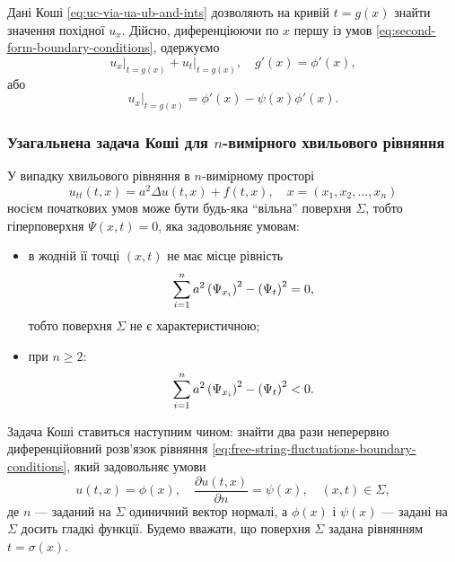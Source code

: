 Дані Коші \eqref{eq:uc-via-ua-ub-and-ints} дозволяють на кривій $t = g(x)$ знайти значення похідної $u_x$. Дійсно, диференціюючи по $x$ першу із умов \eqref{eq:second-form-boundary-conditions}, одержуємо
\begin{equation}
    \left. u_x \right|_{t = g(x)} + \left. u_t \right|_{t = g(x)}, \quad g'(x) = \phi'(x),
\end{equation}
або
\begin{equation}
    \left. u_x \right|_{t = g(x)} = \phi'(x) - \psi(x) \phi'(x).
\end{equation}

\subsubsection{Узагальнена задача Коші для \texorpdfstring{$n$}{n}-вимірного хвильового рівняння}

У випадку хвильового рівняння в $n$-вимірному просторі
\begin{equation}
    \label{eq:utt-equation}
    u_{tt}(t, x) = a^2 \Delta u(t, x) + f(t, x), \quad x = (x_1, x_2, \ldots, x_n)
\end{equation}
носієм початкових умов може бути будь-яка ``вільна'' поверхня $\Sigma$, тобто гіперповерхня $\Psi(x, t) = 0$, яка задовольняє умовам:
\begin{itemize}
    \item в жодній її точці $(x, t)$ не має місце рівність
    \begin{equation}
        \displaystyle\sum\limits_{i = 1}^n a^2 \left( \Psi_{x_i} \right)^2 - \left( \Psi_t \right)^2 = 0,
    \end{equation}
    тобто поверхня $\Sigma$ не є характеристичною;
    \item при $n \ge 2$:
    \begin{equation}
        \label{eq:psi-inequality-condition}
        \displaystyle\sum\limits_{i = 1}^n a^2 \left( \Psi_{x_i} \right)^2 - \left( \Psi_t \right)^2 < 0.
    \end{equation}
\end{itemize}

Задача Коші ставиться наступним чином: знайти два рази неперервно диференційовний розв'язок рівняння \eqref{eq:free-string-fluctuations-boundary-conditions}, який задовольняє умови
\begin{equation}
    \label{eq:utx-boundary-conditions}
    u(t, x) = \phi(x), \quad \frac{\partial u(t, x)}{\partial n} = \psi(x), \quad (x, t) \in \Sigma,
\end{equation}
де $n$ --- заданий на $\Sigma$ одиничний вектор нормалі, а $\phi(x)$ і $\psi(x)$ --- задані на $\Sigma$ досить гладкі функції. Будемо вважати, що поверхня $\Sigma$ задана рівнянням $t = \sigma(x)$. \medskip

